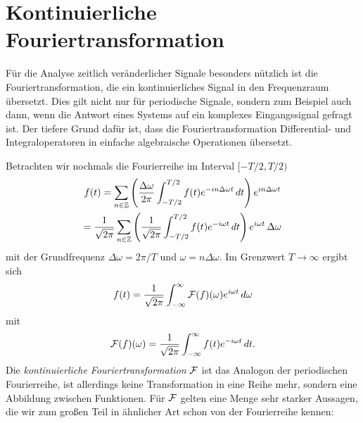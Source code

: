 \section{Kontinuierliche Fouriertransformation}

Für die Analyse zeitlich veränderlicher Signale besonders nützlich ist
die Fouriertransformation, die ein kontinuierliches Signal in den
Frequenzraum übersetzt. Dies gilt nicht nur für periodische Signale,
sondern zum Beispiel auch dann, wenn die Antwort eines Systems auf ein
komplexes Eingangssignal gefragt ist. Der tiefere Grund dafür ist,
dass die Fouriertransformation Differential- und Integraloperatoren in
einfache algebraische Operationen übersetzt.

Betrachten wir nochmals die Fourierreihe im Interval $[-T/2,T/2)$
\begin{multline}
  f(t) = \sum_{n\in\mathbb{Z}}
  \left(\frac{\Delta\omega}{2\pi}\int_{-T/2}^{T/2}
    f(t)e^{-i n\Delta\omega t}\, dt\right)
  e^{i n\Delta\omega t}\\
  =
  \frac{1}{\sqrt{2\pi}}\sum_{n\in\mathbb{Z}}
  \left(\frac{1}{\sqrt{2\pi}}\int_{-T/2}^{T/2} f(t)e^{-i \omega t}\,dt\right)
  e^{i \omega t}\,\Delta\omega
\end{multline}
mit der Grundfrequenz $\Delta\omega=2\pi/T$ und
$\omega=n\Delta\omega$. Im Grenzwert $T\to\infty$ ergibt sich
\begin{equation}
  \label{eq:contfourierinverse}
  f(t) = \frac{1}{\sqrt{2\pi}}\int_{-\infty}^{\infty}
  \mathcal F(f)(\omega)e^{i \omega t}\,d\omega
\end{equation}
mit
\begin{equation}
  \label{eq:contfourier}
  \mathcal F(f)(\omega) =
  \frac{1}{\sqrt{2\pi}}\int_{-\infty}^{\infty} f(t)e^{-i \omega t}\, dt.
\end{equation}
Die \emph{kontinuierliche Fouriertransformation} $\mathcal F$ ist das
Analogon der periodischen Fourierreihe, ist allerdings keine
Transformation in eine Reihe mehr, sondern eine Abbildung zwischen
Funktionen. Für $\mathcal F$ gelten eine Menge sehr starker Aussagen, die wir
zum großen Teil in ähnlicher Art schon von der Fourierreihe kennen:
